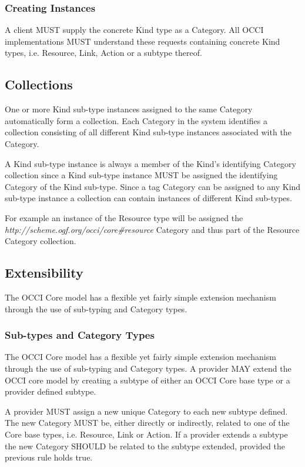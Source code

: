 \documentclass[10pt,a4paper,british]{article}
\begin{document}
\subsubsection{Creating Instances}
A client MUST supply the concrete Kind type as a Category. All OCCI
implementations MUST understand these requests containing concrete
Kind types, i.e. Resource, Link, Action or a subtype thereof.

\subsection{Collections}
\label{sec:collection}
One or more Kind sub-type instances assigned to the same Category
automatically form a collection. Each Category in the system
identifies a collection consisting of all different Kind sub-type instances
associated with the Category.

A Kind sub-type instance is always a member of the Kind's identifying
Category collection since a Kind sub-type instance MUST be assigned the
identifying Category of the Kind sub-type.
Since a tag Category can be assigned to any Kind sub-type
instance a collection can contain instances of different Kind
sub-types.

For example an instance of the Resource type will be assigned the
\textit{http://scheme.ogf.org/occi/core\#resource} Category and thus
part of the Resource Category collection.

\subsection{Extensibility}
The OCCI Core model has a flexible yet fairly simple extension
mechanism through the use of sub-typing and Category types.

\subsubsection{Sub-types and Category Types}
The OCCI Core model has a flexible yet fairly simple extension
mechanism through the use of sub-typing and Category types.  A
provider MAY extend the OCCI core model by creating a subtype of
either an OCCI Core base type or a provider defined subtype.

A provider MUST assign a new unique Category to each new subtype
defined. The new Category MUST be, either directly or indirectly,
related to one of the Core base types, i.e. Resource, Link or
Action. If a provider extends a subtype the new Category SHOULD be
related to the subtype extended, provided the previous rule holds
true.
\end{document}
